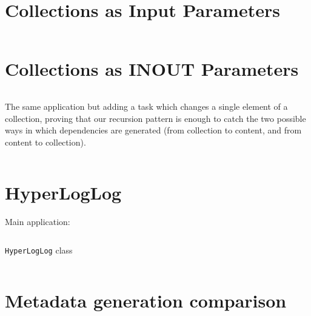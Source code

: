 \chapter{Collections as Input Parameters}
\label{subsec:col_in_program}
\inputminted[breaklines = true]{python}{applications/COLLECTION_IN/resources_in_master.py}

\chapter{Collections as INOUT Parameters}
\label{subsec:col_inout_program}
\inputminted[breaklines = true]{python}{applications/COLLECTION_INOUT/resources_in_worker.py}

The same application but adding a task which changes a single element of a collection, proving that our recursion pattern is enough to catch the two possible ways in which dependencies are generated (from collection to content, and from content to collection).

\inputminted[breaklines = true]{python}{applications/COLLECTION_INOUT/resources_in_worker_complex_workflow.py}


\chapter{HyperLogLog}
\label{subsec:hyperloglog_source_code}
Main application:
\inputminted[breaklines = true]{python}{applications/HYPERLOGLOG/main.py}
\verb|HyperLogLog| class
\inputminted[breaklines = true]{python}{applications/HYPERLOGLOG/HyperLogLog.py}


\chapter{Metadata generation comparison}
\label{subsec:reduce_data_comparison}

